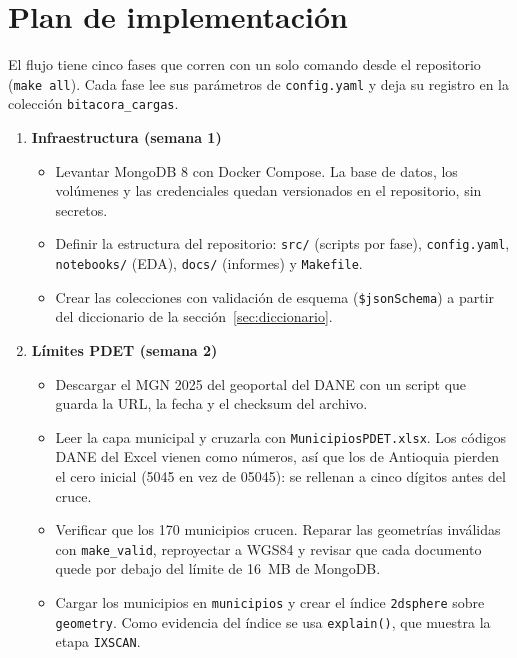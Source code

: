 \documentclass[11pt,a4paper]{article}
\newcommand{\campo}[1]{\texttt{#1}}
\begin{document}
\section{Plan de implementación}
\label{sec:plan}

El flujo tiene cinco fases que corren con un solo comando desde el
repositorio (\campo{make all}). Cada fase lee sus parámetros de
\campo{config.yaml} y deja su registro en la colección
\campo{bitacora\_cargas}.

\begin{enumerate}[leftmargin=*]
  \item \textbf{Infraestructura (semana 1)}
  \begin{itemize}
    \item Levantar MongoDB 8 con Docker Compose. La base de datos, los
          volúmenes y las credenciales quedan versionados en el repositorio,
          sin secretos.
    \item Definir la estructura del repositorio: \campo{src/} (scripts por
          fase), \campo{config.yaml}, \campo{notebooks/} (EDA), \campo{docs/}
          (informes) y \campo{Makefile}.
    \item Crear las colecciones con validación de esquema
          (\campo{\$jsonSchema}) a partir del diccionario de la
          sección~\ref{sec:diccionario}.
  \end{itemize}

  \item \textbf{Límites PDET (semana 2)}
  \begin{itemize}
    \item Descargar el MGN 2025 del geoportal del DANE con un script que
          guarda la URL, la fecha y el checksum del archivo.
    \item Leer la capa municipal y cruzarla con \campo{MunicipiosPDET.xlsx}.
          Los códigos DANE del Excel vienen como números, así que los de
          Antioquia pierden el cero inicial (5045 en vez de 05045): se
          rellenan a cinco dígitos antes del cruce.
    \item Verificar que los 170 municipios crucen. Reparar las geometrías
          inválidas con \campo{make\_valid}, reproyectar a WGS84 y revisar
          que cada documento quede por debajo del límite de 16~MB de MongoDB.
    \item Cargar los municipios en \campo{municipios} y crear el índice
          \campo{2dsphere} sobre \campo{geometry}. Como evidencia del índice
          se usa \campo{explain()}, que muestra la etapa \campo{IXSCAN}.
  \end{itemize}


\end{enumerate}
\end{document}
